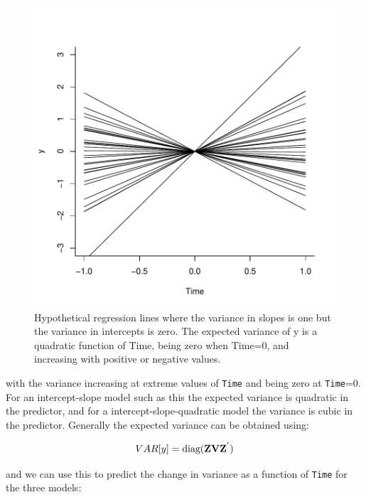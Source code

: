 \documentclass{article}
\begin{document}
\begin{figure}[!h]
\begin{center}
\includegraphics{Lecture4-030}
\end{center}
\caption{Hypothetical regression lines where the variance in slopes is one but the variance in intercepts is zero. The expected variance of y is a quadratic function of Time, being zero when Time=0, and increasing with positive or negative values.}
\label{RRtoy-fig}
\end{figure}


with the variance increasing at extreme values of \texttt{Time} and being zero at \texttt{Time}=0.  For an intercept-slope model such as this the expected variance is quadratic in the predictor, and for a intercept-slope-quadratic model the variance is cubic in the predictor. Generally the expected variance can be obtained using:

\begin{displaymath}
VAR[y] = \textrm{diag}({\bf Z}{\bf V}{\bf Z}^{'})
\label{RRvar-eq}
\end{displaymath}
  
and we can use this to predict the change in variance as a function of \texttt{Time} for the three models:
\end{document}
